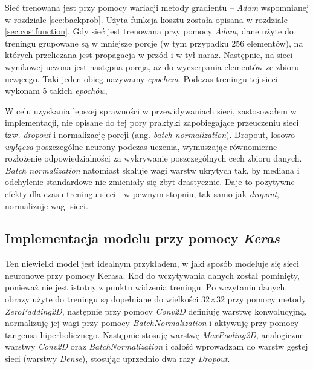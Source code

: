 Sieć trenowana jest przy pomocy wariacji metody gradientu -- \textit{Adam} wspomnianej w rozdziale \ref{sec:backprob}. Użyta
funkcja kosztu została opisana w rozdziale \ref{sec:costfunction}. Gdy sieć
jest trenowana przy pomocy \textit{Adam}, dane użyte do treningu grupowane są w
mniejsze porcje (w tym przypadku 256 elementów), na których przeliczana
jest propagacja w przód i w tył naraz. Następnie, na sieci wynikowej
uczona jest następna porcja, aż do wyczerpania elementów ze zbioru
uczącego. Taki jeden obieg nazywamy \textit{epochem}. Podczas treningu tej sieci
wykonam 5 takich \textit{epochów},

W celu uzyskania lepszej sprawności w przewidywaniach sieci,
zastosowałem w implementacji, nie opisane do tej pory praktyki
zapobiegające przeuczeniu sieci tzw. \textit{dropout} i normalizację porcji
(ang. \textit{batch normalization}). Dropout, losowo \textit{wyłącza} poszczególne
neurony podczas uczenia, wymuszając równomierne rozłożenie
odpowiedzialności za wykrywanie poszczególnych cech zbioru danych. \textit{Batch
normalization} natomiast skaluje wagi warstw ukrytych tak, by mediana i
odchylenie standardowe nie zmieniały się zbyt drastycznie. Daje to
pozytywne efekty dla czasu treningu sieci i w pewnym stopniu, tak samo
jak \textit{dropout}, normalizuje wagi
sieci.

\subsection{Implementacja modelu przy pomocy \textit{Keras}}

Ten niewielki model jest idealnym przykładem, w jaki sposób modeluje się sieci neuronowe przy pomocy Kerasa. 
Kod do wczytywania danych został pominięty, ponieważ nie jest istotny z punktu widzenia treningu. 
Po wczytaniu danych, obrazy użyte do treningu są dopełniane do wielkości 32\(\times\)32 przy pomocy metody \textit{ZeroPadding2D}, 
następnie przy pomocy \textit{Conv2D} definiuję warstwę konwolucyjną, normalizuję jej wagi przy pomocy \textit{BatchNormalization} i 
aktywuję przy pomocy tangensa hiperbolicznego. Następnie stosuję warstwę \textit{MaxPooling2D}, analogiczne warstwy 
\textit{Conv2D} oraz \textit{BatchNormalization} i całość wprowadzam do warstw gęstej sieci (warstwy \textit{Dense}), stosując uprzednio dwa razy \textit{Dropout}.

